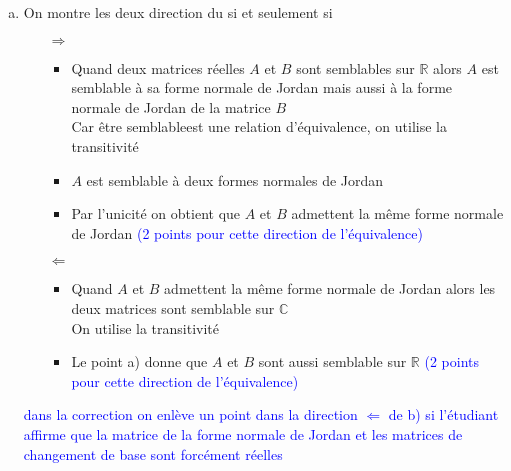 \documentclass[11pt, a4paper, oneside]{article}
\newcommand{\indice}[1]{{\scriptsize \color{RubineRed} {#1}}}
\begin{document}
\begin{enumerate}[a)]
\item
\indice{On montre les deux direction du si et seulement si}
\begin{itemize}
    \item [$\Longrightarrow$] 
    \begin{itemize} 
    \item Quand deux matrices réelles $A$ et $B$ sont semblables sur $\mathbb{R}$ alors $A$ est semblable à sa forme normale de Jordan mais aussi à la forme normale de Jordan de la matrice $B$ \\
    \indice{Car \flqq être semblable\frqq est une relation d'équivalence, on utilise la transitivité}
    \item $A$ est semblable à deux formes normales de Jordan
    \item Par l'unicité on obtient que $A$ et $B$ admettent la même forme normale de Jordan \textcolor{blue}{(2 points pour cette direction de l'équivalence)}
    \end{itemize}    

    \item [$\Longleftarrow$] 
    \begin{itemize} 
    \item Quand $A$ et $B$ admettent la même forme normale de Jordan alors les deux matrices sont semblable sur $\mathbb{C}$ \\
    \indice{On utilise la transitivité}
    \item Le point a) donne que $A$ et $B$ sont aussi semblable sur $\mathbb{R}$ \textcolor{blue}{(2 points pour cette direction de l'équivalence)} \\
\end{itemize}
\end{itemize}
\textcolor{blue}{dans la correction on enlève un point dans la direction $\Longleftarrow$ de b) si l'étudiant affirme que la matrice de la forme normale de Jordan et les matrices de changement de base sont forcément réelles}
\end{enumerate}
\end{document}
